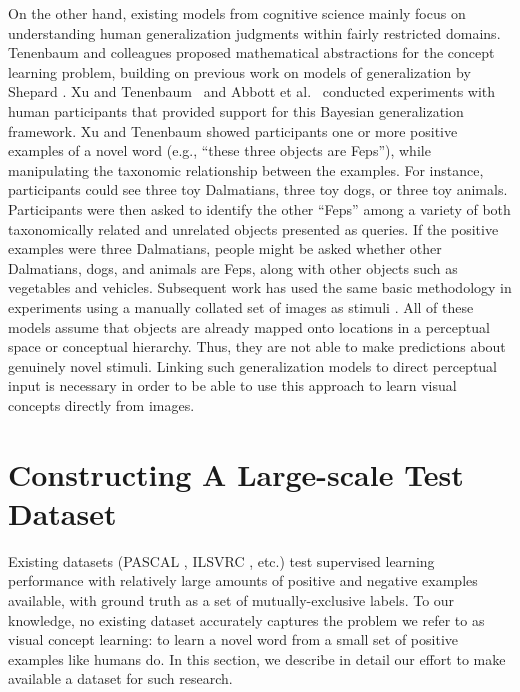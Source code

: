 On the other hand, existing models from cognitive science mainly focus on understanding
human generalization judgments within fairly restricted domains. Tenenbaum
and colleagues \cite{tenenbaum99,tenenbaum2001generalization} proposed
mathematical abstractions for the concept learning problem, building on
previous work on models of generalization by Shepard \cite{shepard1987toward}. Xu
and Tenenbaum~\cite{xu2007word} and Abbott et al.~\cite{abbottconstructing} conducted
experiments with human participants that provided support for this
Bayesian generalization framework. Xu and Tenenbaum \cite{xu2007word} showed participants one or more positive examples of a novel word (e.g., ``these three objects are Feps''), while manipulating the taxonomic relationship between the examples. For instance, participants could see three toy Dalmatians, three toy dogs, or three toy animals. Participants were then asked to identify the other ``Feps'' among a variety of both taxonomically related and unrelated objects presented as queries. If the positive examples were three Dalmatians, people might be asked whether other Dalmatians, dogs, and animals are Feps, along with other objects such as vegetables and vehicles. Subsequent work has used the same basic methodology in experiments using a manually collated set of images as stimuli \cite{abbottconstructing}. All of these models assume that objects
are already mapped onto locations in a perceptual space or conceptual
hierarchy. Thus, they are not able to make predictions about genuinely
novel stimuli. Linking such generalization models to direct perceptual
input is necessary in order to be able to use this approach to learn
visual concepts directly from images.




\section{Constructing A Large-scale Test Dataset}\label{sec:mechturk}

Existing datasets (PASCAL \cite{pascal}, ILSVRC \cite{ilsvrc}, etc.) test supervised learning performance with relatively large amounts of positive and negative examples available, with ground truth as a set of mutually-exclusive labels. To our knowledge, no existing dataset accurately captures the problem we refer to as visual concept learning: to learn a novel word from a small set of positive examples like humans do. In this section, we describe in detail our effort to make available a dataset for such research.

